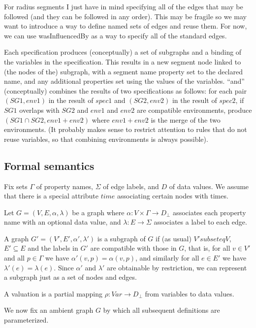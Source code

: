 \documentclass{article}
\begin{document}
For radius segments I just have in mind specifying all of the edges
that may be followed (and they can be followed in any order).  This
may be fragile so we may want to introduce a way to define named sets
of edges and reuse them.  For now, we can use wasInfluencedBy as a way
to specify all of the standard edges.

Each specification produces (conceptually) a set of subgraphs and a
binding of the variables in the specification.  This results in a new
segment node linked to (the nodes of the) subgraph, with a segment
name property set to the declared name, and any additional properties
set using the values of the variables.  ``and'' (conceptually) combines
the results of two specifications as follows: for each pair $(SG1,env1)$
in the result of $spec1$ and $(SG2,env2)$ in the result of $spec2$, if $SG1$
overlaps with $SG2$ and $env1$ and $env2$ are compatible environments,
produce $(SG1 \cap SG2, env1 + env2)$ where $env1 + env2$ is the merge of
the two environments.  (It probably makes sense to restrict attention
to rules that do not reuse variables, so that combining environments
is always possible).

\subsection{Formal semantics}

Fix sets $\Gamma$ of property names, $\Sigma$ of edge labels, and $D$
of data values.  We assume that there is a special attribute $time$
associating certain nodes with times.

Let $G = (V,E, \alpha, \lambda)$ be a graph where
$\alpha : V\times \Gamma \to D_\bot$ associates each property name
with an optional data value, and $\lambda : E \to \Sigma$ associates a
label to each edge.

A graph $G' = (V',E',\alpha',\lambda')$ is a subgraph of $G$ if (as
usual) $V' subseteq V$, $E'\subseteq E$ and the labels in $G'$ are
compatible with those in $G$, that is, for all $v\in V'$ and all $p
\in \Gamma$ we have $\alpha'(v,p) = \alpha(v,p)$, and
similarly for all $e \in E'$ we have $\lambda'(e) = \lambda(e)$.
Since $\alpha'$ and $\lambda'$ are obtainable by restriction, we can
represent a subgraph just as a set of nodes and edges.  


A valuation is a partial mapping $\rho : Var \to D_\bot$ from
variables to data values.

We now fix an ambient graph $G$ by which all subsequent definitions
are parameterized.
\end{document}
